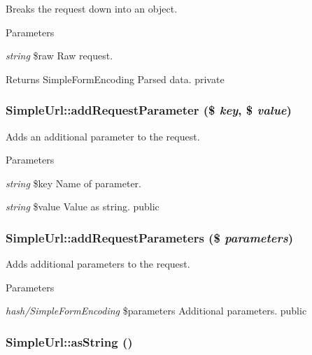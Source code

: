 \label{class_simple_url_adb792cc59598aacaaadb5adc428efda8}
Breaks the request down into an object. 
\begin{DoxyParams}{Parameters}
\item[{\em string}]\$raw Raw request. \end{DoxyParams}
\begin{DoxyReturn}{Returns}
SimpleFormEncoding Parsed data.  private 
\end{DoxyReturn}
\hypertarget{class_simple_url_a340f16158f6b4e31b41759faab48c0b5}{
\subsubsection[{addRequestParameter}]{\setlength{\rightskip}{0pt plus 5cm}SimpleUrl::addRequestParameter (\$ {\em key}, \/  \$ {\em value})}}
\label{class_simple_url_a340f16158f6b4e31b41759faab48c0b5}
Adds an additional parameter to the request. 
\begin{DoxyParams}{Parameters}
\item[{\em string}]\$key Name of parameter. \item[{\em string}]\$value Value as string.  public \end{DoxyParams}
\hypertarget{class_simple_url_a1aa2b909d32c56aac770263592d2844e}{
\subsubsection[{addRequestParameters}]{\setlength{\rightskip}{0pt plus 5cm}SimpleUrl::addRequestParameters (\$ {\em parameters})}}
\label{class_simple_url_a1aa2b909d32c56aac770263592d2844e}
Adds additional parameters to the request. 
\begin{DoxyParams}{Parameters}
\item[{\em hash/SimpleFormEncoding}]\$parameters Additional parameters.  public \end{DoxyParams}
\hypertarget{class_simple_url_aacb36466e60fa5c022e9c30fb82caf67}{
\subsubsection[{asString}]{\setlength{\rightskip}{0pt plus 5cm}SimpleUrl::asString ()}}
